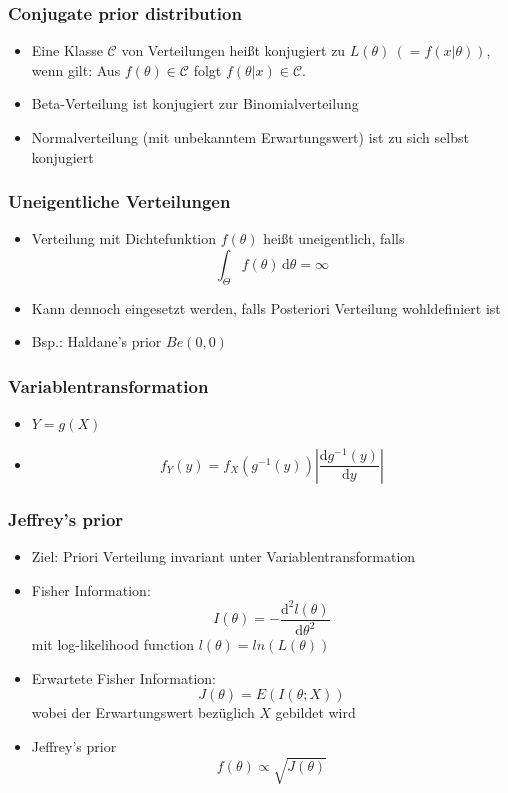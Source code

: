 \documentclass[aspectratio=169,xcolor=dvipsnames]{beamer}
\begin{document}
\begin{frame}
\frametitle{Conjugate prior distribution}
\begin{itemize}
	\item<1-> Eine Klasse $\mathscr{C}$ von Verteilungen heißt konjugiert zu $L(\theta)~(=f(x|\theta))$, wenn gilt: Aus $f(\theta)\in\mathscr{C}$ folgt $f(\theta|x)\in\mathscr{C}$.
	\item<2-> Beta-Verteilung ist konjugiert zur Binomialverteilung
	\item<3-> Normalverteilung (mit unbekanntem Erwartungswert) ist zu sich selbst konjugiert
\end{itemize}
\end{frame}

\begin{frame}
\frametitle{Uneigentliche Verteilungen}
\begin{itemize}
	\item<1-> Verteilung mit Dichtefunktion $f(\theta)$ heißt uneigentlich, falls $$\int_{\Theta}f(\theta)\,\text{d}\theta = \infty$$
	\item<2-> Kann dennoch eingesetzt werden, falls Posteriori Verteilung wohldefiniert ist
	\item<3-> Bsp.: Haldane's prior $Be(0,0)$
\end{itemize}
\end{frame}

\begin{frame}
\frametitle{Variablentransformation}
\begin{itemize}
	\item $Y=g(X)$
	\item $$f_Y(y)=f_X(g^{-1}(y))\left|\frac{\text{d}g^{-1}(y)}{\text{d}y}\right|$$
\end{itemize}
\end{frame}

\begin{frame}
\frametitle{Jeffrey's prior}
\begin{itemize}
	\item<1-> Ziel: Priori Verteilung invariant unter Variablentransformation
	\item<2-> Fisher Information: $$I(\theta)=-\frac{\text{d}^2l(\theta)}{\text{d}\theta^2}$$
	mit log-likelihood function $l(\theta)=ln(L(\theta))$
	\item<3-> Erwartete Fisher Information: $$J(\theta)=E(I(\theta;X))$$
	wobei der Erwartungswert bezüglich $X$ gebildet wird
	\item<4-> Jeffrey's prior $$f(\theta)\propto\sqrt{J(\theta)}$$
\end{itemize}
\end{frame}
\end{document}
